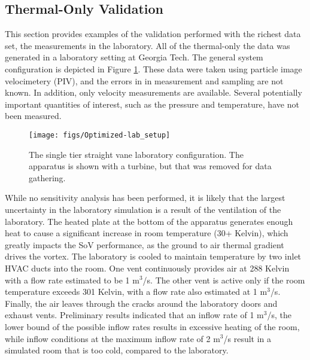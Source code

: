 \subsection{Thermal-Only Validation}
This section provides examples of the validation performed with the
richest data set, the measurements in the laboratory. All of the
thermal-only the data was generated in a laboratory setting at Georgia
Tech. The general system configuration is depicted in Figure
\ref{fig:lab_image}. These data were taken using particle image
velocimetery (PIV), and the errors in in measurement and sampling are
not known. In addition, only velocity measurements are
available. Several potentially important quantities of interest, such as
the pressure and temperature, have not been measured. 

%
%
 \begin{figure}[!htb]
   \begin{center}
    \texttt{[image: figs/Optimized-lab\_setup]}
    \caption{The single tier straight vane laboratory configuration. The
    apparatus is shown with a turbine, but that was removed for data
    gathering.}
    \label{fig:lab_image}
   \end{center}
 \end{figure}

While no sensitivity analysis has been performed, it is likely that the
largest uncertainty in the laboratory simulation is a result of the
ventilation of the laboratory. The heated plate at the bottom of the apparatus
generates enough heat to cause a significant increase in room
temperature (30+ Kelvin), which greatly impacts the SoV
performance, as the ground to air thermal gradient drives the
vortex. The laboratory is cooled to maintain
temperature by two inlet HVAC ducts into the room. 
One vent continuously provides air at 288 Kelvin with a flow rate estimated 
to be 1 $\text{m}^3$/s.
The other vent is active only if the room temperature exceeds 301 Kelvin, 
with a flow rate also estimated at 1 $\text{m}^3$/s.
Finally, the air leaves through the cracks around the laboratory doors and 
exhaust vents. Preliminary results indicated that an inflow rate of 1
$\text{m}^3$/s, the lower bound of the possible inflow rates results in
excessive heating of the room, while inflow conditions at the maximum
inflow rate of 2 $\text{m}^3$/s result in a simulated room that is too cold,
compared to the laboratory.  

